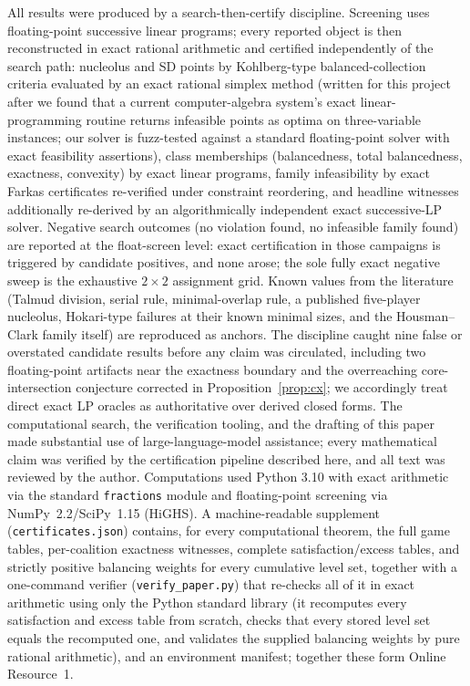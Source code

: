 \documentclass[11pt]{article}
\begin{document}
All results were produced by a search-then-certify discipline. Screening
uses floating-point successive linear programs; every reported object is
then reconstructed in exact rational arithmetic and certified independently
of the search path: nucleolus and SD points by Kohlberg-type
balanced-collection criteria evaluated by an exact rational simplex method
(written for this project after we found that a current computer-algebra
system's exact linear-programming routine returns infeasible points as
optima on three-variable instances; our solver is fuzz-tested against a
standard floating-point solver with exact feasibility assertions), class
memberships (balancedness, total balancedness, exactness, convexity) by
exact linear programs, family infeasibility by exact Farkas certificates
re-verified under constraint reordering, and headline witnesses additionally
re-derived by an algorithmically independent exact successive-LP solver.
Negative search outcomes (no violation found, no infeasible family found)
are reported at the float-screen level: exact certification in those
campaigns is triggered by candidate positives, and none arose; the sole
fully exact negative sweep is the exhaustive $2\times2$ assignment grid.
Known values from the literature (Talmud division, serial rule,
minimal-overlap rule, a published five-player nucleolus, Hokari-type
failures at their known minimal sizes, and the Housman--Clark family itself)
are reproduced as anchors. The discipline caught nine false or overstated
candidate results before any claim was circulated, including two
floating-point artifacts near the exactness boundary and the overreaching
core-intersection conjecture corrected in Proposition~\ref{prop:cx}; we
accordingly treat direct exact LP oracles as authoritative over derived
closed forms. The computational search, the verification tooling, and the
drafting of this paper made substantial use of large-language-model
assistance; every mathematical claim was verified by the certification
pipeline described here, and all text was reviewed by the author.
Computations used Python 3.10 with exact arithmetic via the
standard \texttt{fractions} module and floating-point screening via
NumPy~2.2/SciPy~1.15 (HiGHS). A machine-readable supplement
(\texttt{certificates.json}) contains, for every computational theorem, the
full game tables, per-coalition exactness witnesses, complete
satisfaction/excess tables, and strictly positive balancing weights for
every cumulative level set, together with a one-command verifier
(\texttt{verify\_paper.py}) that re-checks all of it in exact arithmetic
using only the Python standard library (it recomputes every satisfaction
and excess table from scratch, checks that every stored level set equals
the recomputed one, and validates the supplied balancing weights by pure
rational arithmetic), and an environment manifest; together these form
Online Resource~1.
\end{document}
